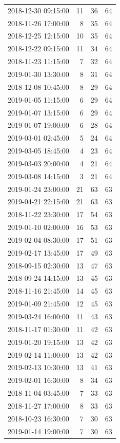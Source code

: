 \begin{tabular}{lrrr}
2018-12-30 09:15:00 & 11 & 36 & 64 \\
2018-11-26 17:00:00 & 8 & 35 & 64 \\
2018-12-25 12:15:00 & 10 & 35 & 64 \\
2018-12-22 09:15:00 & 11 & 34 & 64 \\
2018-11-23 11:15:00 & 7 & 32 & 64 \\
2019-01-30 13:30:00 & 8 & 31 & 64 \\
2018-12-08 10:45:00 & 8 & 29 & 64 \\
2019-01-05 11:15:00 & 6 & 29 & 64 \\
2019-01-07 13:15:00 & 6 & 29 & 64 \\
2019-01-07 19:00:00 & 6 & 28 & 64 \\
2019-03-01 02:45:00 & 5 & 24 & 64 \\
2019-03-05 18:45:00 & 4 & 23 & 64 \\
2019-03-03 20:00:00 & 4 & 21 & 64 \\
2019-03-08 14:15:00 & 3 & 21 & 64 \\
2019-01-24 23:00:00 & 21 & 63 & 63 \\
2019-04-21 22:15:00 & 21 & 63 & 63 \\
2018-11-22 23:30:00 & 17 & 54 & 63 \\
2019-01-10 02:00:00 & 16 & 53 & 63 \\
2019-02-04 08:30:00 & 17 & 51 & 63 \\
2019-02-17 13:45:00 & 17 & 49 & 63 \\
2018-09-15 02:30:00 & 13 & 47 & 63 \\
2018-09-24 14:15:00 & 13 & 45 & 63 \\
2018-11-16 21:45:00 & 14 & 45 & 63 \\
2019-01-09 21:45:00 & 12 & 45 & 63 \\
2019-03-24 16:00:00 & 11 & 43 & 63 \\
2018-11-17 01:30:00 & 11 & 42 & 63 \\
2019-01-20 19:15:00 & 13 & 42 & 63 \\
2019-02-14 11:00:00 & 13 & 42 & 63 \\
2019-02-13 10:30:00 & 13 & 41 & 63 \\
2019-02-01 16:30:00 & 8 & 34 & 63 \\
2018-11-04 03:45:00 & 7 & 33 & 63 \\
2018-11-27 17:00:00 & 8 & 33 & 63 \\
2018-10-23 16:30:00 & 7 & 30 & 63 \\
2019-01-14 19:00:00 & 7 & 30 & 63 \\

\end{tabular}
